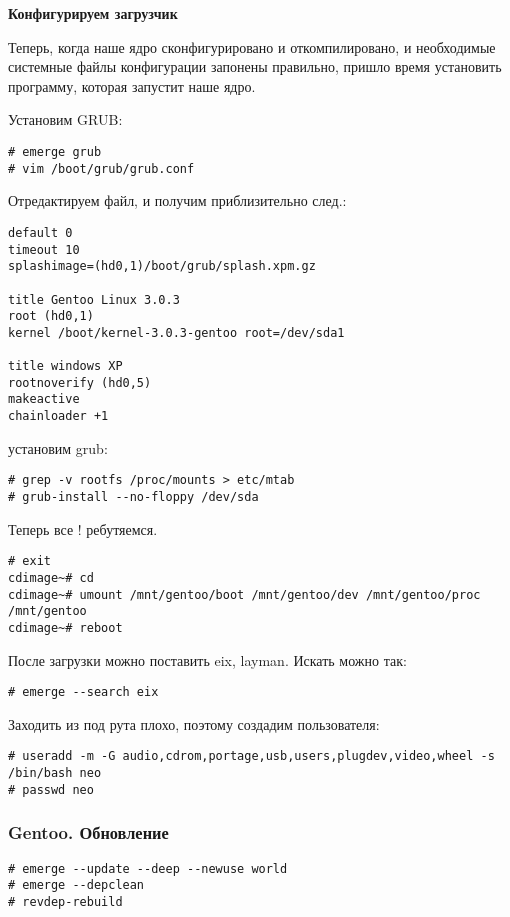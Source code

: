 \documentclass[12pt, a4paper]{article}
\begin{document}
{\bf Конфигурируем загрузчик}

Теперь, когда наше ядро сконфигурировано и откомпилировано, и необходимые системные файлы конфигурации запонены правильно, пришло время установить программу, которая запустит наше ядро.

Установим GRUB:

\begin{verbatim}
# emerge grub
# vim /boot/grub/grub.conf
\end{verbatim}

Отредактируем файл, и получим приблизительно след.:

\begin{verbatim}
default 0
timeout 10
splashimage=(hd0,1)/boot/grub/splash.xpm.gz

title Gentoo Linux 3.0.3
root (hd0,1)
kernel /boot/kernel-3.0.3-gentoo root=/dev/sda1

title windows XP
rootnoverify (hd0,5)
makeactive
chainloader +1
\end{verbatim}

установим grub:

\begin{verbatim}
# grep -v rootfs /proc/mounts > etc/mtab
# grub-install --no-floppy /dev/sda
\end{verbatim}

Теперь все ! ребутяемся.

\begin{verbatim}
# exit 
cdimage~# cd 
cdimage~# umount /mnt/gentoo/boot /mnt/gentoo/dev /mnt/gentoo/proc /mnt/gentoo
cdimage~# reboot

\end{verbatim}

После загрузки можно поставить eix, layman.
Искать можно так:
\begin{verbatim}
# emerge --search eix
\end{verbatim}

Заходить из под рута плохо, поэтому создадим пользователя:
\begin{verbatim}
# useradd -m -G audio,cdrom,portage,usb,users,plugdev,video,wheel -s /bin/bash neo
# passwd neo
\end{verbatim}


\subsubsection{Gentoo. Обновление}

\begin{verbatim}
# emerge --update --deep --newuse world
# emerge --depclean
# revdep-rebuild
\end{verbatim}
\end{document}
